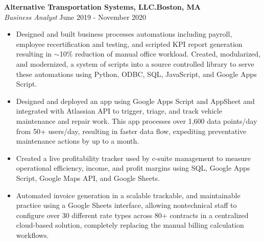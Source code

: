 \documentclass[a4paper]{article}
\begin{document}
\textbf{Alternative Transportation Systems, LLC.\hfill Boston, MA}\\
\textit{Business Analyst} \hfill June 2019 - November 2020\\
\vspace{-1mm}
\begin{itemize} \itemsep 1pt
	\item Designed and built business processes automations including payroll, employee recertification and testing, and scripted KPI report generation resulting in $\sim$10\% reduction of manual office workload. 
    Created, modularized, and modernized, a system of scripts into a source controlled library to serve these automations using Python, ODBC, SQL, JavaScript, and Google Apps Script.
	\item Designed and deployed an app using Google Apps Script and AppSheet and integrated with Atlassian API to trigger, triage, and track vehicle maintenance and repair work. This app processes over 1,600 data points/day from 50+ users/day, resulting in faster data flow, expediting preventative maintenance actions by up to a month.
	\item Created a live profitability tracker used by c-suite management to measure operational efficiency, income, and profit margins using SQL, Google Apps Script, Google Maps API, and Google Sheets.
	\item Automated invoice generation in a scalable trackable, and maintainable practice using a Google Sheets interface, allowing nontechnical staff to configure over 30 different rate types across 80+ contracts in a centralized cloud-based solution, completely replacing the manual billing calculation workflows.
\end{itemize}
\end{document}

